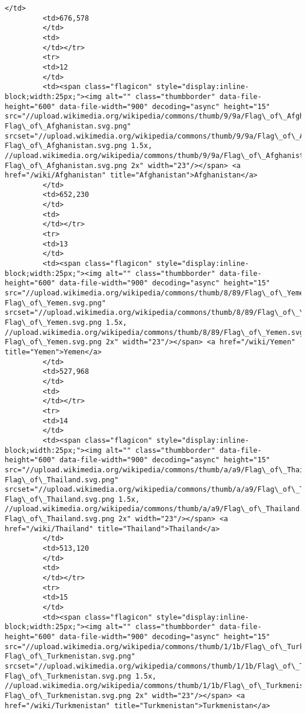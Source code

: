 \documentclass[11pt]{article}
\begin{document}
\begin{Verbatim}[commandchars=\\\{\}]
         </td>
         <td>676,578
         </td>
         <td>
         </td></tr>
         <tr>
         <td>12
         </td>
         <td><span class="flagicon" style="display:inline-block;width:25px;"><img alt="" class="thumbborder" data-file-height="600" data-file-width="900" decoding="async" height="15" src="//upload.wikimedia.org/wikipedia/commons/thumb/9/9a/Flag\_of\_Afghanistan.svg/23px-Flag\_of\_Afghanistan.svg.png" srcset="//upload.wikimedia.org/wikipedia/commons/thumb/9/9a/Flag\_of\_Afghanistan.svg/35px-Flag\_of\_Afghanistan.svg.png 1.5x, //upload.wikimedia.org/wikipedia/commons/thumb/9/9a/Flag\_of\_Afghanistan.svg/45px-Flag\_of\_Afghanistan.svg.png 2x" width="23"/></span> <a href="/wiki/Afghanistan" title="Afghanistan">Afghanistan</a>
         </td>
         <td>652,230
         </td>
         <td>
         </td></tr>
         <tr>
         <td>13
         </td>
         <td><span class="flagicon" style="display:inline-block;width:25px;"><img alt="" class="thumbborder" data-file-height="600" data-file-width="900" decoding="async" height="15" src="//upload.wikimedia.org/wikipedia/commons/thumb/8/89/Flag\_of\_Yemen.svg/23px-Flag\_of\_Yemen.svg.png" srcset="//upload.wikimedia.org/wikipedia/commons/thumb/8/89/Flag\_of\_Yemen.svg/35px-Flag\_of\_Yemen.svg.png 1.5x, //upload.wikimedia.org/wikipedia/commons/thumb/8/89/Flag\_of\_Yemen.svg/45px-Flag\_of\_Yemen.svg.png 2x" width="23"/></span> <a href="/wiki/Yemen" title="Yemen">Yemen</a>
         </td>
         <td>527,968
         </td>
         <td>
         </td></tr>
         <tr>
         <td>14
         </td>
         <td><span class="flagicon" style="display:inline-block;width:25px;"><img alt="" class="thumbborder" data-file-height="600" data-file-width="900" decoding="async" height="15" src="//upload.wikimedia.org/wikipedia/commons/thumb/a/a9/Flag\_of\_Thailand.svg/23px-Flag\_of\_Thailand.svg.png" srcset="//upload.wikimedia.org/wikipedia/commons/thumb/a/a9/Flag\_of\_Thailand.svg/35px-Flag\_of\_Thailand.svg.png 1.5x, //upload.wikimedia.org/wikipedia/commons/thumb/a/a9/Flag\_of\_Thailand.svg/45px-Flag\_of\_Thailand.svg.png 2x" width="23"/></span> <a href="/wiki/Thailand" title="Thailand">Thailand</a>
         </td>
         <td>513,120
         </td>
         <td>
         </td></tr>
         <tr>
         <td>15
         </td>
         <td><span class="flagicon" style="display:inline-block;width:25px;"><img alt="" class="thumbborder" data-file-height="600" data-file-width="900" decoding="async" height="15" src="//upload.wikimedia.org/wikipedia/commons/thumb/1/1b/Flag\_of\_Turkmenistan.svg/23px-Flag\_of\_Turkmenistan.svg.png" srcset="//upload.wikimedia.org/wikipedia/commons/thumb/1/1b/Flag\_of\_Turkmenistan.svg/35px-Flag\_of\_Turkmenistan.svg.png 1.5x, //upload.wikimedia.org/wikipedia/commons/thumb/1/1b/Flag\_of\_Turkmenistan.svg/45px-Flag\_of\_Turkmenistan.svg.png 2x" width="23"/></span> <a href="/wiki/Turkmenistan" title="Turkmenistan">Turkmenistan</a>

\end{Verbatim}
\end{document}
